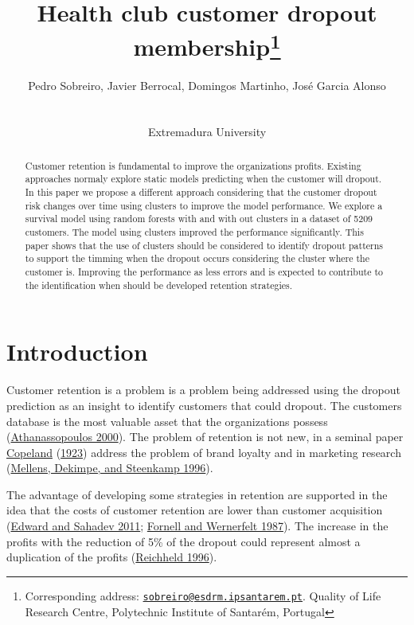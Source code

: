 \documentclass[
  12pt,
]{article}
\title{\hfill\break
\hfill\break
\hfill\break
\vspace{1cm}Health club customer dropout membership\footnote{Corresponding address: \href{mailto:sobreiro@esdrm.ipsantarem.pt}{\nolinkurl{sobreiro@esdrm.ipsantarem.pt}}. Quality of Life Research Centre, Polytechnic Institute of Santarém, Portugal}\vspace{0.5cm}}
\author{Pedro Sobreiro, Javier Berrocal, Domingos Martinho, José Garcia Alonso\\
\strut \\
Extremadura University\\}
\date{\hfill\break
\hfill\break
21 julho, 2022\\
\strut \\}
\begin{document}
\maketitle
\begin{abstract}
\vspace{1cm}

Customer retention is fundamental to improve the organizations profits. Existing approaches normaly explore static models predicting when the customer will dropout. In this paper we propose a different approach considering that the customer dropout risk changes over time using clusters to improve the model performance. We explore a survival model using random forests with and with out clusters in a dataset of 5209 customers. The model using clusters improved the performance significantly. This paper shows that the use of clusters should be considered to identify dropout patterns to support the timming when the dropout occurs considering the cluster where the customer is. Improving the performance as less errors and is expected to contribute to the identification when should be developed retention strategies. \vspace{.8cm}
\end{abstract}

\hypertarget{introduction}{%
\section{Introduction}\label{introduction}}

Customer retention is a problem is a problem being addressed using the dropout
prediction as an insight to identify customers that could dropout.
The customers database is the most valuable asset that the organizations possess
(\protect\hyperlink{ref-Athanassopoulos_2000}{Athanassopoulos 2000}).
The problem of retention is not new, in a seminal paper \protect\hyperlink{ref-Copeland_1923}{Copeland} (\protect\hyperlink{ref-Copeland_1923}{1923}) address
the problem of brand loyalty and in marketing research (\protect\hyperlink{ref-Mellens_Dekimpe_Steenkamp_1996}{Mellens, Dekimpe, and Steenkamp 1996}).

The advantage of developing some strategies in retention are supported in the idea
that the costs of customer retention are lower than customer acquisition
(\protect\hyperlink{ref-Edward_Sahadev_2011}{Edward and Sahadev 2011}; \protect\hyperlink{ref-Fornell_Wernerfelt_1987}{Fornell and Wernerfelt 1987}).
The increase in the profits with the reduction of 5\% of the dropout could represent
almost a duplication of the profits (\protect\hyperlink{ref-Reichheld_1996}{Reichheld 1996}).
\end{document}
